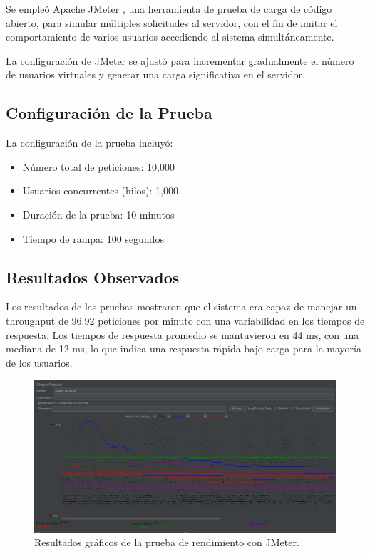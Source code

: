 Se empleó Apache JMeter \cite{jmeter}, una herramienta de prueba de carga de código abierto, para simular múltiples solicitudes al servidor, con el fin de imitar el comportamiento de varios usuarios accediendo al sistema simultáneamente. 

La configuración de JMeter se ajustó para incrementar gradualmente el número de usuarios virtuales y generar una carga significativa en el servidor.

\subsection{Configuración de la Prueba}

La configuración de la prueba incluyó:

\begin{itemize}
    \item Número total de peticiones: 10,000
    \item Usuarios concurrentes (hilos): 1,000
    \item Duración de la prueba: 10 minutos
    \item Tiempo de rampa: 100 segundos
\end{itemize}

\subsection{Resultados Observados}

Los resultados de las pruebas mostraron que el sistema era capaz de manejar un throughput de 96.92 peticiones por minuto con una variabilidad en los tiempos de respuesta. Los tiempos de respuesta promedio se mantuvieron en 44 ms, con una mediana de 12 ms, lo que indica una respuesta rápida bajo carga para la mayoría de los usuarios.

\begin{figure}[H]
\centering
\includegraphics[width=\textwidth]{imagenes/graforendimiento.png}
\caption{Resultados gráficos de la prueba de rendimiento con JMeter.}
\label{fig:grafico-jmeter}
\end{figure}

